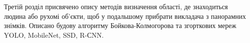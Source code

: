 Третій розділ присвячено опису методів визначення області,
де знаходиться людина або рухомі об'єкти,
щоб у подальшому прибрати викладача з панорамних знімків.
Описано будову алгоритму Бойкова-Колмогорова та згорткових мереж 
YOLO, MobileNet, SSD, R-СNN.
